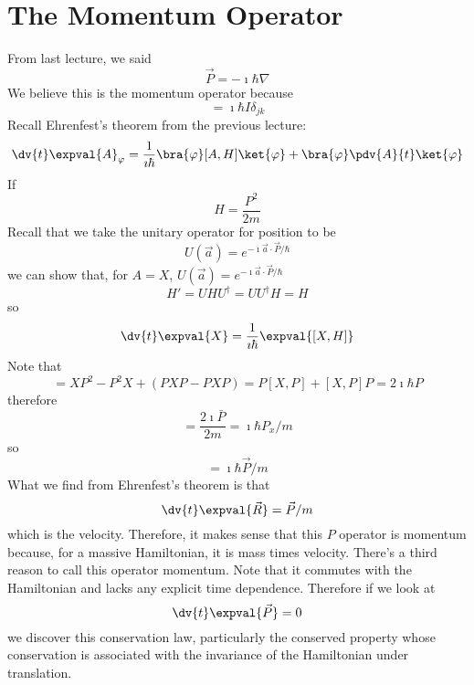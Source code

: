 \documentclass[a4paper,twoside,master.tex]{subfiles}
\begin{document}
\section{The Momentum Operator}
\label{sec:the_momentum_operator}

From last lecture, we said
\begin{equation}
    \vec{P} = - \imath\hbar\nabla
\end{equation}
We believe this is the momentum operator because
\begin{equation}
    [ \vec{R}_j, \vec{P}_k ] = \imath\hbar I \delta_{jk}
\end{equation}
Recall Ehrenfest's theorem from the previous lecture:
\begin{equation}
    \dv{t}\expval{A}_{\varphi} = \frac{1}{\imath\hbar} \bra{\varphi} [A,H] \ket{\varphi} + \bra{\varphi} \pdv{A}{t} \ket{\varphi}
\end{equation}
If
\begin{equation}
    H = \frac{P^2}{2m}
\end{equation}
Recall that we take the unitary operator for position to be
\begin{equation}
    U( \vec{a} ) = e^{-\imath \vec{a} \cdot \vec{P} / \hbar}
\end{equation}
we can show that, for $ A = X $, $ U( \vec{a} ) = e^{-\imath \vec{a} \cdot \vec{P} / \hbar} $
\begin{equation}
    H' = UHU^\dagger = UU^\dagger H = H
\end{equation}
so
\begin{equation}
    \dv{t}\expval{X} = \frac{1}{\imath\hbar}\expval{[X,H]}
\end{equation}
Note that
\begin{equation}
    [X,P^2] = XP^2 - P^2 X + (PXP - PXP) = P[X,P] + [X,P]P = 2\imath\hbar P
\end{equation}
therefore
\begin{equation}
    [X,H] = \frac{2\imath\bar P}{2m} = \imath\hbar P_x/m
\end{equation}
so
\begin{equation}
    [ \vec{R}, H ] = \imath\hbar \vec{P} / m
\end{equation}
What we find from Ehrenfest's theorem is that
\begin{equation}
    \dv{t}\expval{ \vec{R}}= \vec{P} / m
\end{equation}
which is the velocity. Therefore, it makes sense that this $ P $ operator is momentum because, for a massive Hamiltonian, it is mass times velocity. There's a third reason to call this operator momentum. Note that it commutes with the Hamiltonian and lacks any explicit time dependence. Therefore if we look at
\begin{equation}
    \dv{t}\expval{ \vec{P} } = 0
\end{equation}
we discover this conservation law, particularly the conserved property whose conservation is associated with the invariance of the Hamiltonian under translation.
\end{document}
